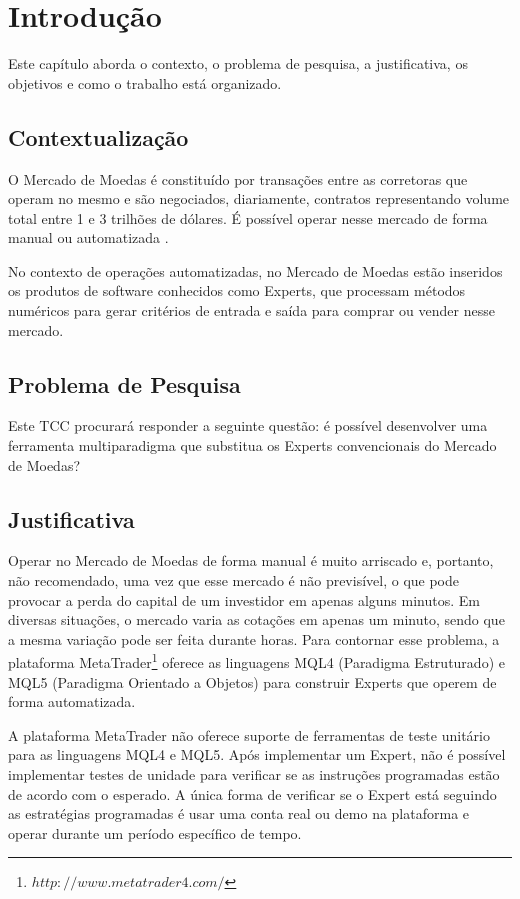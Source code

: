 \chapter{Introdução}
Este capítulo aborda o contexto, o problema de pesquisa, a justificativa, os objetivos e como o trabalho está organizado.

\section{Contextualização}
O Mercado de Moedas é constituído por transações entre as corretoras que operam no mesmo e são negociados, diariamente, contratos representando volume total entre 1 e 3 trilhões de dólares. É possível operar nesse mercado de forma manual ou automatizada \cite{cvm2009}.

No contexto de operações automatizadas, no Mercado de Moedas estão inseridos os produtos de software conhecidos como Experts, que processam métodos numéricos para gerar critérios de entrada e saída para comprar ou vender nesse mercado.

\section{Problema de Pesquisa}
Este TCC procurará responder a seguinte questão: é possível desenvolver uma ferramenta multiparadigma que substitua os Experts convencionais do Mercado de Moedas? 

\section{Justificativa}

Operar no Mercado de Moedas de forma manual é muito arriscado e, portanto, não recomendado, uma vez que esse mercado é não previsível, o que pode provocar a perda do capital de um investidor em apenas alguns minutos. Em diversas situações, o mercado varia as cotações em apenas um minuto, sendo que a mesma variação pode ser feita durante horas. Para contornar esse problema, a plataforma MetaTrader\footnote{$ http://www.metatrader4.com/$} oferece as linguagens MQL4 (Paradigma Estruturado) e MQL5 (Paradigma Orientado a Objetos) para construir Experts que operem de forma automatizada. 

A plataforma MetaTrader não oferece suporte de ferramentas de teste unitário para as linguagens MQL4 e MQL5. Após implementar um Expert, não é possível implementar testes de unidade para verificar se as instruções programadas estão de acordo com o esperado. A única forma de verificar se o Expert está seguindo as estratégias programadas é usar uma conta real ou demo na plataforma e operar durante um período específico de tempo.

